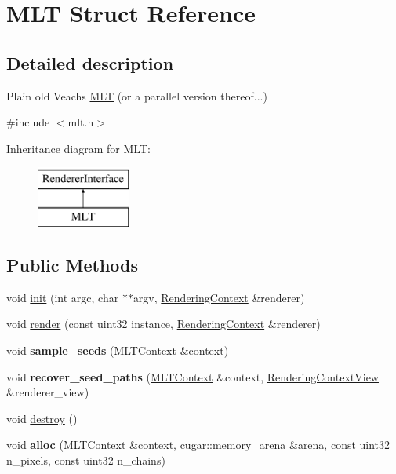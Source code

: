 \hypertarget{struct_m_l_t}{}\section{M\+LT Struct Reference}
\label{struct_m_l_t}


\subsection{Detailed description}
Plain old Veach\textquotesingle{}s \hyperlink{struct_m_l_t}{M\+LT} (or a parallel version thereof...) 

{\ttfamily \#include $<$mlt.\+h$>$}

Inheritance diagram for M\+LT\+:\begin{figure}[H]
\begin{center}
\leavevmode
\includegraphics[height=2.000000cm]{struct_m_l_t}
\end{center}
\end{figure}
\subsection*{Public Methods}
\begin{DoxyCompactItemize}
\item 
void \hyperlink{struct_m_l_t_a3e5f5dc01f80a3c599384660163ad3d7}{init} (int argc, char $\ast$$\ast$argv, \hyperlink{struct_rendering_context}{Rendering\+Context} \&renderer)
\item 
void \hyperlink{struct_m_l_t_ac7f187ec2fdd67baedb0cf1d74060b89}{render} (const uint32 instance, \hyperlink{struct_rendering_context}{Rendering\+Context} \&renderer)
\item 
\mbox{\label{struct_m_l_t_adcee8659ac95d2d4abd896f1c2626393}} 
void {\bfseries sample\+\_\+seeds} (\hyperlink{struct_m_l_t_context}{M\+L\+T\+Context} \&context)
\item 
\mbox{\label{struct_m_l_t_a0655a66c36124ce73b914528fc6e7d41}} 
void {\bfseries recover\+\_\+seed\+\_\+paths} (\hyperlink{struct_m_l_t_context}{M\+L\+T\+Context} \&context, \hyperlink{struct_rendering_context_view}{Rendering\+Context\+View} \&renderer\+\_\+view)
\item 
void \hyperlink{struct_m_l_t_adb75fd53b62131575a9f739953eeac67}{destroy} ()
\item 
\mbox{\label{struct_m_l_t_aee09a067e1c8e36be42399142c667f61}} 
void {\bfseries alloc} (\hyperlink{struct_m_l_t_context}{M\+L\+T\+Context} \&context, \hyperlink{structcugar_1_1memory__arena}{cugar\+::memory\+\_\+arena} \&arena, const uint32 n\+\_\+pixels, const uint32 n\+\_\+chains)
\end{DoxyCompactItemize}
